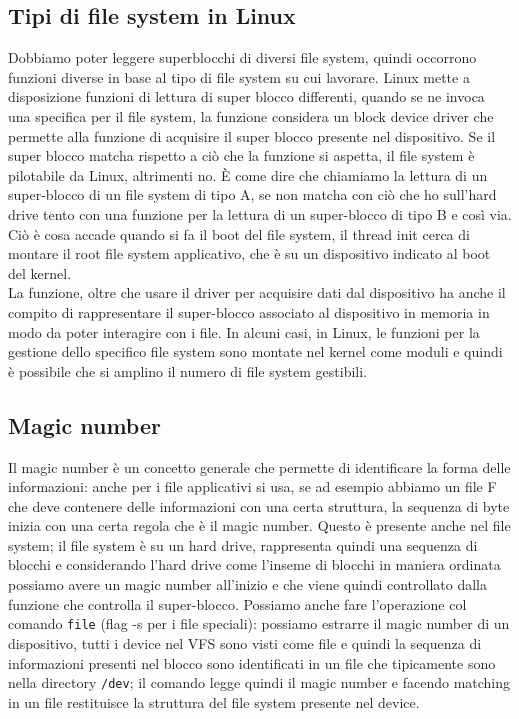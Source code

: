 \documentclass[12pt, oneside]{extbook}
\begin{document}
\subsection{Tipi di file system in Linux}
Dobbiamo poter leggere superblocchi di diversi file system, quindi occorrono funzioni diverse in base al tipo di file system su cui lavorare. Linux mette a disposizione funzioni di lettura di super blocco differenti, quando se ne invoca una specifica per il file system, la funzione considera un block device driver che permette alla funzione di acquisire il super blocco presente nel dispositivo. Se il super blocco matcha rispetto a ciò che la funzione si aspetta, il file system è pilotabile da Linux, altrimenti no. È come dire che chiamiamo la lettura di un super-blocco di un file system di tipo A, se non matcha con ciò che ho sull'hard drive tento con una funzione per la lettura di un super-blocco di tipo B e così via.\\Ciò è cosa accade quando si fa il boot del file system, il thread init cerca di montare il root file system applicativo, che è su un dispositivo indicato al boot del kernel.\\La funzione, oltre che usare il driver per acquisire dati dal dispositivo ha anche il compito di rappresentare il super-blocco associato al dispositivo in memoria in modo da poter interagire con i file. In alcuni casi, in Linux, le funzioni per la gestione dello specifico file system sono montate nel kernel come moduli e quindi è possibile che si amplino il numero di file system gestibili.
\subsection{Magic number}
Il magic number è un concetto generale che permette di identificare la forma delle informazioni: anche per i file applicativi si usa, se ad esempio abbiamo un file F che deve contenere delle informazioni con una certa struttura, la sequenza di byte inizia con una certa regola che è il magic number. Questo è presente anche nel file system; il file system è su un hard drive, rappresenta quindi una sequenza di blocchi e considerando l'hard drive come l'inseme di blocchi in maniera ordinata possiamo avere un magic number all'inizio e che viene quindi controllato dalla funzione che controlla il super-blocco. Possiamo anche fare l'operazione col comando \texttt{file} (flag -s per i file speciali): possiamo estrarre il magic number di un dispositivo, tutti i device nel VFS sono visti come file e quindi la sequenza di informazioni presenti nel blocco sono identificati in un file che tipicamente sono nella directory \texttt{/dev}; il comando legge quindi il magic number e facendo matching in un file restituisce la struttura del file system presente nel device.
\end{document}
